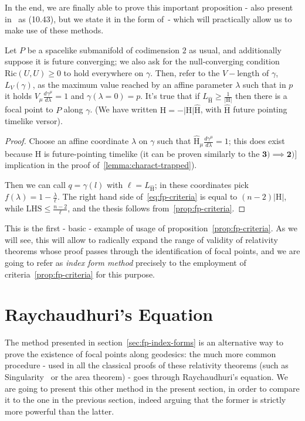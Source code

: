 In the end, we are finally able to prove this important proposition - also present in~\cite{o1983semi} as (10.43), but we state it in the form of~\cite{fewster2020new}- which will practically allow us to make use of these methods.
\begin{corollary}
	\label{cor:fp-criteria}
	Let \(P\) be a spacelike submanifold of codimension \(2\) as usual, and additionally suppose it is future converging; we also ask for the null-converging condition \(\text{Ric}(U, U) \ge 0\) to hold everywhere on \(\gamma\). Then, refer to the \(V-\)length of \(\gamma\), \(L_V(\gamma)\), as the maximum value reached by an affine parameter \(\lambda\) such that in \(p\) it holds \(V_{\mu}\frac{d\gamma^{\mu}}{d\lambda} = 1\) and \(\gamma(\lambda = 0) = p\). It's true that if \(L_{\hat{\mathrm{H}}} \ge \frac{1}{|\mathrm{H}|}\) then there is a focal point to \(P\) along \(\gamma\). (We have written \(\mathrm{H} = - |\mathrm{H}|\hat{\mathrm{H}}\), with \(\hat{\mathrm{H}}\) future pointing timelike versor).
\end{corollary}

\begin{proof}
	Choose an affine coordinate \(\lambda\) on \(\gamma\) such that \(\hat{\mathrm{H}}_{\mu}\frac{d\gamma^{\mu}}{d\lambda} = 1\); this does exist because \(\mathrm{H}\) is future-pointing timelike (it can be proven similarly to the \(\mathbf{3) \implies 2)]}\) implication in the proof of~\ref{lemma:charact-trapped}).
		
	Then we can call \(q = \gamma(l)\) with \(\ell = L_{\hat{\mathrm{H}}}\); in these coordinates pick \(f(\lambda) = 1 - \frac{\lambda}{\ell}\). The right hand side of~\eqref{eq:fp-criteria} is equal to \((n-2)|\mathrm{H}|\), while \(\text{LHS} \le \frac{n - 2}{\ell}\), and the thesis follows from~\ref{prop:fp-criteria}.
\end{proof}

This is the first - basic - example of usage of proposition~\ref{prop:fp-criteria}. As we will see, this will allow to radically expand the range of validity of relativity theorems whose proof passes through the identification of focal points, and we are going to refer as \emph{index form method} precisely to the employment of criteria~\ref{prop:fp-criteria} for this purpose.
	
\section{Raychaudhuri's Equation}
The method presented in section~\ref{sec:fp-index-forms} is an alternative way to prove the existence of focal points along geodesics: the much more common procedure - used in all the classical proofs of these relativity theorems (such as Singularity~\cite{penrose1965gravitational} or the area theorem) - goes through Raychaudhuri's equation. We are going to present this other method in the present section, in order to compare it to the one in the previous section, indeed arguing that the former is strictly more powerful than the latter.
	
